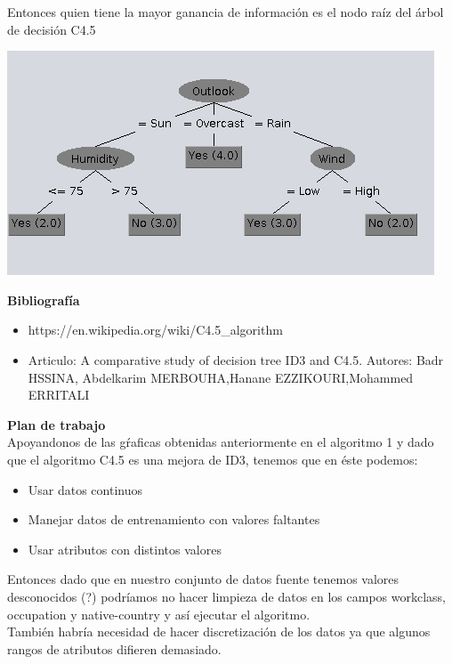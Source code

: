 \documentclass{article}
\begin{document}
Entonces quien tiene la mayor ganancia de información es el nodo raíz del árbol de decisión C4.5

\begin{center}
 \includegraphics[scale=0.7]{arbol}\\
\end{center}

{\bf Bibliografía}
\begin{itemize}
 \item https://en.wikipedia.org/wiki/C4.5\_algorithm
 \item Articulo: A comparative study of decision tree ID3 and C4.5. Autores: Badr HSSINA, Abdelkarim MERBOUHA,Hanane EZZIKOURI,Mohammed ERRITALI
\end{itemize}


{\bf Plan de trabajo}\\

Apoyandonos de las gŕaficas obtenidas anteriormente en el algoritmo 1 y dado que el algoritmo C4.5 es una mejora de ID3, tenemos que en éste podemos:
\begin{itemize}
\item Usar datos continuos
\item Manejar datos de entrenamiento con valores faltantes
\item Usar atributos con distintos valores
\end{itemize}

Entonces dado que en nuestro conjunto de datos fuente tenemos valores desconocidos (?) podríamos no hacer limpieza de datos en los campos workclass, occupation y native-country y así ejecutar el algoritmo.\\

También habría necesidad de hacer discretización de los datos ya que algunos rangos de atributos difieren demasiado.
\end{document}
